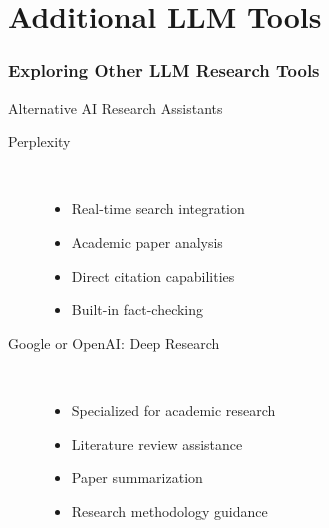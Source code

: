 \documentclass{beamer}
\begin{document}
\section{Additional LLM Tools}
\frame{\sectionpage}

\begin{frame}
\frametitle{Exploring Other LLM Research Tools}

\begin{block}{Alternative AI Research Assistants}
\begin{description}
\item[Perplexity] \hfill \\
   \begin{itemize}
   \item Real-time search integration
   \item Academic paper analysis
   \item Direct citation capabilities 
   \item Built-in fact-checking
   \end{itemize}
   
\item[Google or OpenAI: Deep Research] \hfill \\
   \begin{itemize}
   \item Specialized for academic research
   \item Literature review assistance
   \item Paper summarization
   \item Research methodology guidance
   \end{itemize}
\end{description}
\end{block}


\end{frame}
\end{document}
